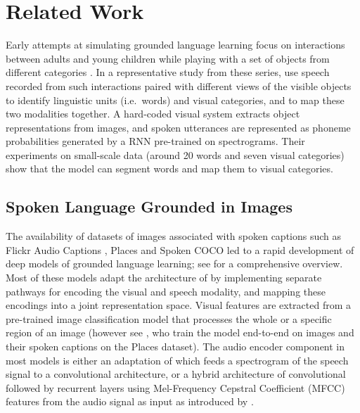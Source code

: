 \section{Related Work}
\label{sec:related}

Early attempts at simulating grounded language learning focus on
interactions between adults and young children while playing with a
set of objects from different categories \cite{roy1999learning,
  roy2000grounded, roy2000learning, roy2002learning,
  gorniak2003visually, mukherjee2003visual}. In a representative study
from these series, \citet{roypentland2002learning} use speech recorded from
such interactions paired with different views of the visible objects
to identify linguistic units (i.e.\ words) and visual categories, and
to map these two modalities together. A hard-coded visual system
extracts object representations from images, and spoken utterances are
represented as phoneme probabilities generated by a RNN pre-trained on
spectrograms.  Their experiments on small-scale data (around 20 words
and seven visual categories) show that the model can segment words and
map them to visual categories.

\subsection{Spoken Language Grounded in Images}
\label{sec:images}
The availability of datasets of images associated with spoken captions
such as Flickr Audio Captions \citep{harwath2015deep}, Places
\cite{zhou2014learning} and Spoken COCO \citep{hsu2019transfer} led to
a rapid development of deep models of grounded language learning; see
\citet{chrupala-visually-2021} for a comprehensive overview. 
 Most of
these models adapt the architecture of \citet{karpathy2014deep} by
implementing separate pathways for encoding the visual and speech
modality, and mapping these encodings into a joint representation
space. Visual features are extracted from a pre-trained
image classification model that processes the whole or a specific
region of an image (however see \citet{harwath2018jointly}, who train the
model end-to-end on images and their spoken captions on the Places
dataset). The audio encoder component in most models is 
either an adaptation of \citet{harwath2016unsupervised} which feeds a
spectrogram of the speech signal to a convolutional architecture, or a
hybrid architecture of convolutional followed by recurrent layers using
Mel-Frequency Cepstral Coefficient (MFCC) features from the audio
signal as input as introduced by \citet{chrupala-etal-2017-representations}.

